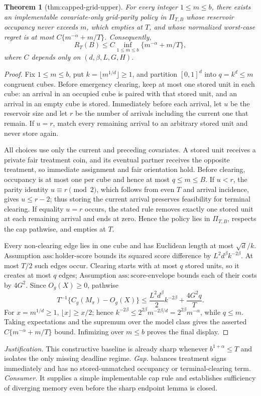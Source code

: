 \documentclass{article}
\newtheorem{theorem}{Theorem}
\begin{document}
\begin{theorem}[thm:capped-grid-upper]\label{thm:capped-grid-upper}
For every integer \(1\le m\le b\), there exists an implementable covariate-only grid-parity policy in \(\Pi_{T,B}\) whose reservoir occupancy never exceeds \(m\), which empties at \(T\), and whose normalized worst-case regret is at most \(C\{m^{-\alpha}+m/T\}\). Consequently, \[R_T(B)\le C\inf_{1\le m\le b}\{m^{-\alpha}+m/T\},\] where \(C\) depends only on \((d,\beta,L,G,H)\).
\end{theorem}
\begin{proof}
Fix \(1\le m\le b\), put \(k=\lfloor m^{1/d}\rfloor\ge1\), and partition \([0,1]^d\) into \(q=k^d\le m\) congruent cubes.  Before emergency clearing, keep at most one stored unit in each cube: an arrival in an occupied cube is paired with that stored unit, and an arrival in an empty cube is stored.  Immediately before each arrival, let \(u\) be the reservoir size and let \(r\) be the number of arrivals including the current one that remain.  If \(u=r\), match every remaining arrival to an arbitrary stored unit and never store again.

All choices use only the current and preceding covariates.  A stored unit receives a private fair treatment coin, and its eventual partner receives the opposite treatment, so immediate assignment and fair orientation hold.  Before clearing, occupancy is at most one per cube and hence at most \(q\le m\le B\).  If \(u<r\), the parity identity \(u\equiv r\pmod 2\), which follows from even \(T\) and arrival incidence, gives \(u\le r-2\); thus storing the current arrival preserves feasibility for terminal clearing.  If equality \(u=r\) occurs, the stated rule removes exactly one stored unit at each remaining arrival and ends at zero.  Hence the policy lies in \(\Pi_{T,B}\), respects the cap pathwise, and empties at \(T\).

Every non-clearing edge lies in one cube and has Euclidean length at most \(\sqrt d/k\).  Assumption \(\mathrm{ass:holder\text{-}score}\) bounds its squared score difference by \(L^2d^\beta k^{-2\beta}\).  At most \(T/2\) such edges occur.  Clearing starts with at most \(q\) stored units, so it creates at most \(q\) edges; Assumption \(\mathrm{ass:score\text{-}envelope}\) bounds each of their costs by \(4G^2\).  Since \(O_g(X)\ge0\), pathwise
\[
T^{-1}\{C_g(M_\pi)-O_g(X)\}
\le \frac{L^2d^\beta}{2}k^{-2\beta}+\frac{4G^2q}{T}.
\]
For \(x=m^{1/d}\ge1\), \(\lfloor x\rfloor\ge x/2\); hence \(k^{-2\beta}\le2^{2\beta}m^{-2\beta/d}=2^{2\beta}m^{-\alpha}\), while \(q\le m\).  Taking expectations and the supremum over the model class gives the asserted \(C\{m^{-\alpha}+m/T\}\) bound.  Infimizing over \(m\le b\) proves the final display.
\end{proof}
\par\smallskip\noindent \textit{Justification.} This constructive baseline is already sharp whenever \(b^{1+\alpha}\le T\) and isolates the only missing deadline regime. \textit{Gap.} \cite{zhaozhou2024pigeonhole} balances treatment signs immediately and has no stored-unmatched occupancy or terminal-clearing term. \textit{Consumer.} It supplies a simple implementable cap rule and establishes sufficiency of diverging memory even before the sharp endpoint lemma is closed.
\end{document}
